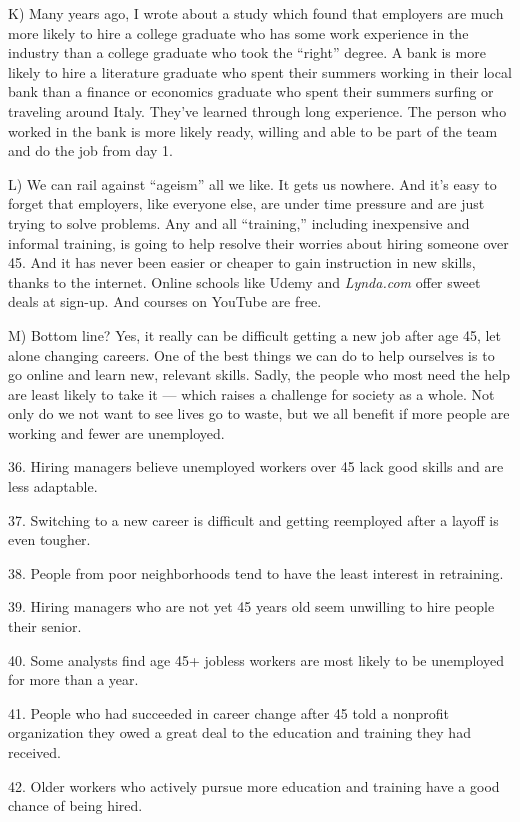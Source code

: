\documentclass[UTF8,11pt]{ctexart}
\begin{document}
K) Many years ago, I wrote about a study which found that employers are much more likely to hire a college graduate who has some work experience in the industry than a college graduate who took the “right” degree. A bank is more likely to hire a literature graduate who spent their summers working in their local bank than a finance or economics graduate who spent their summers surfing or traveling around Italy. They’ve learned through long experience. The person who worked in the bank is more likely ready, willing and able to be part of the team and do the job from day 1.


L) We can rail against “ageism” all we like. It gets us nowhere. And it’s easy to forget that employers, like everyone else, are under time pressure and are just trying to solve problems. Any and all “training,” including inexpensive and informal training, is going to help resolve their worries about hiring someone over 45. And it has never been easier or cheaper to gain instruction in new skills, thanks to the internet. Online schools like Udemy and \textit{Lynda.com} offer sweet deals at sign-up. And courses on YouTube are free.


M) Bottom line? Yes, it really can be difficult getting a new job after age 45, let alone changing careers. One of the best things we can do to help ourselves is to go online and learn new, relevant skills. Sadly, the people who most need the help are least likely to take it — which raises a challenge for society as a whole. Not only do we not want to see lives go to waste, but we all benefit if more people are working and fewer are unemployed.


36. Hiring managers believe unemployed workers over 45 lack good skills and are less adaptable.


37. Switching to a new career is difficult and getting reemployed after a layoff is even tougher.


38. People from poor neighborhoods tend to have the least interest in retraining.


39. Hiring managers who are not yet 45 years old seem unwilling to hire people their senior.


40. Some analysts find age 45+ jobless workers are most likely to be unemployed for more than a year.


41. People who had succeeded in career change after 45 told a nonprofit organization they owed a great deal to the education and training they had received.


42. Older workers who actively pursue more education and training have a good chance of being hired.
\end{document}
